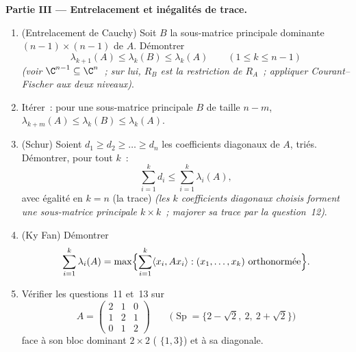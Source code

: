 \begin{problem}
\medskip
\noindent\textbf{Partie III --- Entrelacement et inégalités de
trace.}
\begin{enumerate}[resume]
  \item (Entrelacement de Cauchy) Soit $B$ la sous-matrice principale
        dominante $(n-1)\times(n-1)$ de $A$. Démontrer
        \[
        \lambda_{k+1}(A) \leq \lambda_k(B) \leq \lambda_k(A)
        \qquad (1 \leq k \leq n-1)
        \]
        \emph{(voir $\C^{n-1} \subseteq \C^n$~; sur lui, $R_B$ est
        la restriction de $R_A$~; appliquer Courant--Fischer aux
        deux niveaux)}.
  \item Itérer~: pour une sous-matrice principale $B$ de taille $n - m$,
        $\lambda_{k+m}(A) \leq \lambda_k(B) \leq
        \lambda_k(A)$.
  \item (Schur) Soient $d_1 \geq d_2 \geq \dots \geq d_n$ les
        coefficients diagonaux de $A$, triés. Démontrer, pour tout
        $k$~:
        \[
        \sum_{i=1}^{k} d_i \leq \sum_{i=1}^{k}\lambda_i(A),
        \]
        avec égalité en $k = n$ (la trace)
        \emph{(les $k$ coefficients diagonaux choisis forment une
        sous-matrice principale $k\times k$~; majorer sa trace par
        la question~12)}.
  \item (Ky Fan) Démontrer
        \[
        \sum_{i=1}^{k}\lambda_i(A)
        = \max\Bigl\{\sum_{i=1}^{k}\langle x_i, Ax_i\rangle
        : (x_1, \dots, x_k) \text{ orthonormée}\Bigr\} .
        \]
  \item Vérifier les questions~11 et~13 sur
        \[
        A = \begin{pmatrix} 2 & 1 & 0\\ 1 & 2 & 1\\
        0 & 1 & 2\end{pmatrix}
        \qquad
        \bigl(\operatorname{Sp} = \{2 - \sqrt2,\ 2,\
        2+\sqrt2\}\bigr)
        \]
        face à son bloc dominant $2\times2$ ( $\{1,
        3\}$) et à sa diagonale.
\end{enumerate}


\end{problem}
